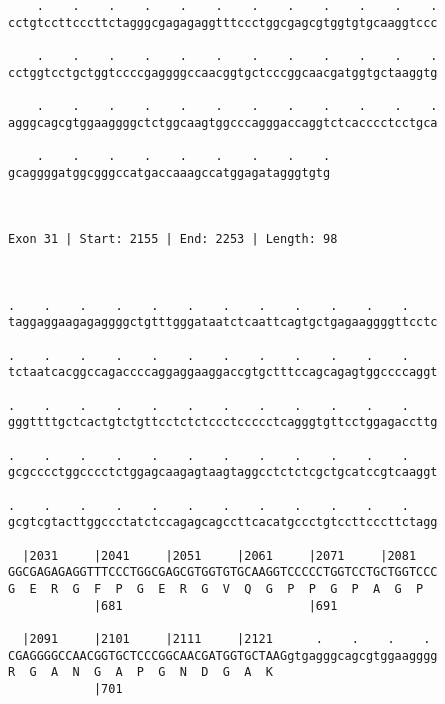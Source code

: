 \documentclass{article}
\begin{document}
\begin{Verbatim}
    .    .    .    .    .    .    .    .    .    .    .    .
cctgtccttcccttctagggcgagagaggtttccctggcgagcgtggtgtgcaaggtccc
                                                            
    .    .    .    .    .    .    .    .    .    .    .    .
cctggtcctgctggtccccgaggggccaacggtgctcccggcaacgatggtgctaaggtg
                                                            
    .    .    .    .    .    .    .    .    .    .    .    .
agggcagcgtggaaggggctctggcaagtggcccagggaccaggtctcacccctcctgca
                                                            
    .    .    .    .    .    .    .    .    .
gcaggggatggcgggccatgaccaaagccatggagatagggtgtg
                                             
                                             
 
Exon 31 | Start: 2155 | End: 2253 | Length: 98



.    .    .    .    .    .    .    .    .    .    .    .    
taggaggaagagaggggctgtttgggataatctcaattcagtgctgagaaggggttcctc
                                                            
.    .    .    .    .    .    .    .    .    .    .    .    
tctaatcacggccagaccccaggaggaaggaccgtgctttccagcagagtggccccaggt
                                                            
.    .    .    .    .    .    .    .    .    .    .    .    
gggttttgctcactgtctgttcctctctccctccccctcagggtgttcctggagaccttg
                                                            
.    .    .    .    .    .    .    .    .    .    .    .    
gcgcccctggcccctctggagcaagagtaagtaggcctctctcgctgcatccgtcaaggt
                                                            
.    .    .    .    .    .    .    .    .    .    .    .    
gcgtcgtacttggccctatctccagagcagccttcacatgccctgtccttcccttctagg
                                                            
  |2031     |2041     |2051     |2061     |2071     |2081   
GGCGAGAGAGGTTTCCCTGGCGAGCGTGGTGTGCAAGGTCCCCCTGGTCCTGCTGGTCCC
G  E  R  G  F  P  G  E  R  G  V  Q  G  P  P  G  P  A  G  P  
            |681                          |691              
  
  |2091     |2101     |2111     |2121      .    .    .    . 
CGAGGGGCCAACGGTGCTCCCGGCAACGATGGTGCTAAGgtgagggcagcgtggaagggg
R  G  A  N  G  A  P  G  N  D  G  A  K                       
            |701                                            
  

\end{Verbatim}
\end{document}
